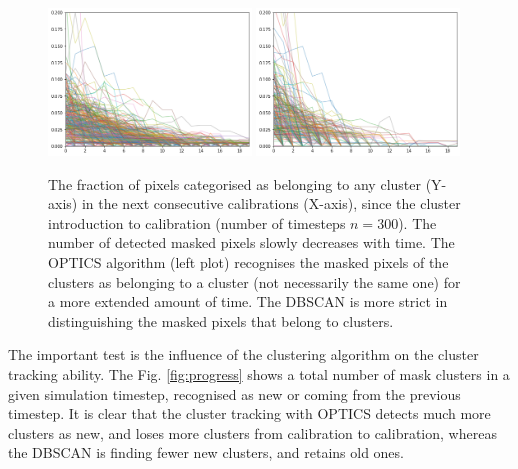 \begin{figure}[H]
\centering
\includegraphics[width=0.48\textwidth]{figures/chapter4/velopix_clusters/optics_decay.png}
\includegraphics[width=0.48\textwidth]{figures/chapter4/velopix_clusters/dbscan_decay.png}
\caption{The fraction of pixels categorised as belonging to any cluster (Y-axis) in the next consecutive calibrations (X-axis), since the cluster introduction to calibration (number of timesteps $n=300$). The number of detected masked pixels slowly decreases with time. The OPTICS algorithm (left plot) recognises the masked pixels of the clusters as belonging to a cluster (not necessarily the same one) for a more extended amount of time. The DBSCAN is more strict in distinguishing the masked pixels that belong to clusters.
}
\label{fig:decay}
\end{figure}

The important test is the influence of the clustering algorithm on the cluster tracking ability. The Fig. \ref{fig:progress} shows a total number of mask clusters in a given simulation timestep, recognised as new or coming from the previous timestep. It is clear that the cluster tracking with OPTICS detects much more clusters as new, and loses more clusters from calibration to calibration, whereas the DBSCAN is finding fewer new clusters, and retains old ones.

